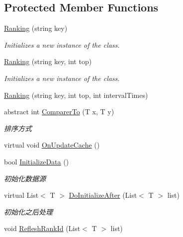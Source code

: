 \subsection*{Protected Member Functions}
\begin{DoxyCompactItemize}
\item 
\mbox{\hyperlink{class_t_net_1_1_com_1_1_rank_1_1_ranking_a73fc28984b075257dca19b9c4ba6bc2b}{Ranking}} (string key)
\begin{DoxyCompactList}\small\item\em Initializes a new instance of the class. \end{DoxyCompactList}\item 
\mbox{\hyperlink{class_t_net_1_1_com_1_1_rank_1_1_ranking_a4f443d2a327457092ee3943b8cff922c}{Ranking}} (string key, int top)
\begin{DoxyCompactList}\small\item\em Initializes a new instance of the class. \end{DoxyCompactList}\item 
\mbox{\hyperlink{class_t_net_1_1_com_1_1_rank_1_1_ranking_a23464bac5898e26b7de225c9be93f32d}{Ranking}} (string key, int top, int interval\+Times)
\item 
abstract int \mbox{\hyperlink{class_t_net_1_1_com_1_1_rank_1_1_ranking_a085c725ac3fa351a51bfebf6a9596901}{Comparer\+To}} (T x, T y)
\begin{DoxyCompactList}\small\item\em 排序方式 \end{DoxyCompactList}\item 
virtual void \mbox{\hyperlink{class_t_net_1_1_com_1_1_rank_1_1_ranking_a0f478ed3382d31882ec78c0b452df8fc}{On\+Update\+Cache}} ()
\item 
bool \mbox{\hyperlink{class_t_net_1_1_com_1_1_rank_1_1_ranking_a38c2dae9aa30ad815b0d1bf9bf5e2445}{Initialize\+Data}} ()
\begin{DoxyCompactList}\small\item\em 初始化数据源 \end{DoxyCompactList}\item 
virtual List$<$ T $>$ \mbox{\hyperlink{class_t_net_1_1_com_1_1_rank_1_1_ranking_a5ac68ac1d83bcd80291fca368d3a63f7}{Do\+Initialize\+After}} (List$<$ T $>$ list)
\begin{DoxyCompactList}\small\item\em 初始化之后处理 \end{DoxyCompactList}\item 
void \mbox{\hyperlink{class_t_net_1_1_com_1_1_rank_1_1_ranking_ae6e494ecbec1bc1b6945bd7e66c46ac4}{Reflesh\+Rank\+Id}} (List$<$ T $>$ list)

\end{DoxyCompactItemize}
